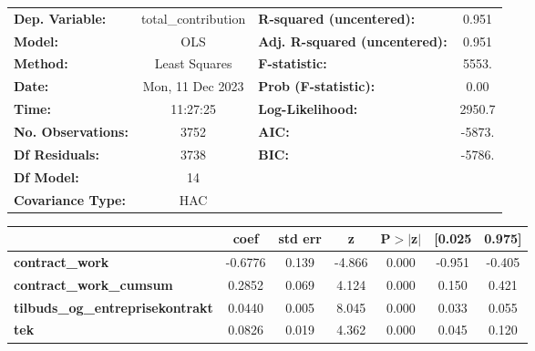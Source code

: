 \begin{center}
\begin{tabular}{lclc}
\toprule
\textbf{Dep. Variable:}                     & total\_contribution & \textbf{  R-squared (uncentered):}      &     0.951   \\
\textbf{Model:}                             &         OLS         & \textbf{  Adj. R-squared (uncentered):} &     0.951   \\
\textbf{Method:}                            &    Least Squares    & \textbf{  F-statistic:       }          &     5553.   \\
\textbf{Date:}                              &   Mon, 11 Dec 2023  & \textbf{  Prob (F-statistic):}          &     0.00    \\
\textbf{Time:}                              &       11:27:25      & \textbf{  Log-Likelihood:    }          &    2950.7   \\
\textbf{No. Observations:}                  &          3752       & \textbf{  AIC:               }          &    -5873.   \\
\textbf{Df Residuals:}                      &          3738       & \textbf{  BIC:               }          &    -5786.   \\
\textbf{Df Model:}                          &            14       & \textbf{                     }          &             \\
\textbf{Covariance Type:}                   &         HAC         & \textbf{                     }          &             \\
\bottomrule
\end{tabular}
\begin{tabular}{lcccccc}
                                            & \textbf{coef} & \textbf{std err} & \textbf{z} & \textbf{P$> |$z$|$} & \textbf{[0.025} & \textbf{0.975]}  \\
\midrule
\textbf{contract\_work}                     &      -0.6776  &        0.139     &    -4.866  &         0.000        &       -0.951    &       -0.405     \\
\textbf{contract\_work\_cumsum}             &       0.2852  &        0.069     &     4.124  &         0.000        &        0.150    &        0.421     \\
\textbf{tilbuds\_og\_entreprisekontrakt}    &       0.0440  &        0.005     &     8.045  &         0.000        &        0.033    &        0.055     \\
\textbf{tek}                                &       0.0826  &        0.019     &     4.362  &         0.000        &        0.045    &        0.120     \\

\end{tabular}
\end{center}
